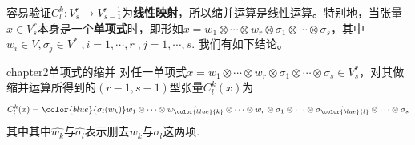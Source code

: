 容易验证$C^{k}_{l}:V^{r}_{s}\longrightarrow V^{r-1}_{s-1}$为\textbf{线性映射}，所以缩并运算是线性运算。特别地，当张量$x\in V^{r}_{s}$本身是一个\textbf{单项式}时，即形如$x=w_{1}\otimes \cdots \otimes w_{r}\otimes\sigma_{1}\otimes\cdots\otimes \sigma_{s}$，其中$w_{i}\in V,\sigma_{j}\in V^{\ast} \;, i=1,\cdots,r\;, j=1,\cdots,s$. 我们有如下结论。
\begin{mythm}{}{chapter2单项式的缩并}
	对任一单项式$x=w_{1}\otimes \cdots \otimes w_{r}\otimes\sigma_{1}\otimes\cdots\otimes \sigma_{s}\in V^{r}_{s}$，对其做缩并运算所得到的$(r-1,s-1)$型张量$C^{k}_{l}(x)$为
	\[
	C^{k}_{l}(x)={\color{blue}{\sigma_{l}(w_{k})}} w_{1}\otimes \cdots\otimes \hat{w_{\color{blue}{k}}}\otimes \cdots\otimes w_{r}\otimes \sigma_{1}\otimes\cdots\otimes \hat{\sigma_{\color{blue}{l}}}\otimes\cdots\otimes  \sigma_{s}
	\]
	其中其中$\hat{w_{k}}$与$\hat{\sigma_{l}}$表示删去$w_{k}$与$\sigma_{l} $这两项.
\end{mythm}
